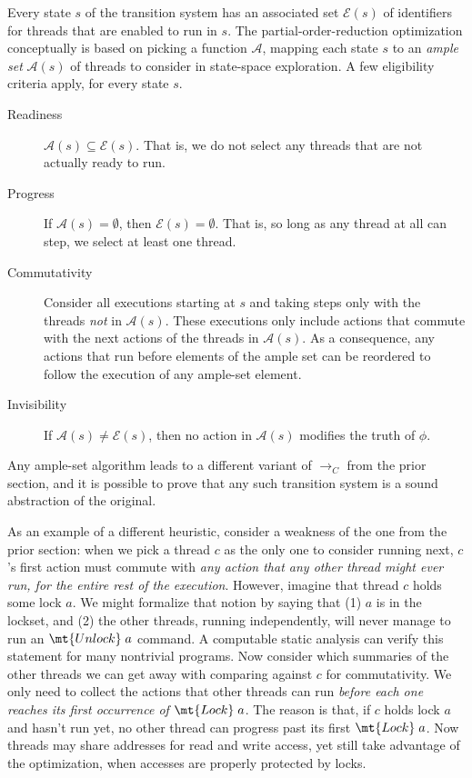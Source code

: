 \documentclass{amsbook}
\theoremstyle{definition}
\theoremstyle{remark}
\numberwithin{section}{chapter}
\numberwithin{equation}{chapter}
\begin{document}
Every state $s$ of the transition system has an associated set $\mathcal E(s)$ of identifiers for threads that are enabled to run in $s$.
The partial-order-reduction optimization conceptually is based on picking a function $\mathcal A$, mapping each state $s$ to an \emph{ample set} $\mathcal A(s)$ of threads to consider in state-space exploration.
A few eligibility criteria apply, for every state $s$.

\begin{description}
  \item[Readiness] $\mathcal A(s) \subseteq \mathcal E(s)$.  That is, we do not select any threads that are not actually ready to run.
  \item[Progress] If $\mathcal A(s) = \emptyset$, then $\mathcal E(s) = \emptyset$.  That is, so long as any thread at all can step, we select at least one thread.
  \item[Commutativity] Consider all executions starting at $s$ and taking steps only with the threads \emph{not} in $\mathcal A(s)$.  These executions only include actions that commute with the next actions of the threads in $\mathcal A(s)$.  As a consequence, any actions that run before elements of the ample set can be reordered to follow the execution of any ample-set element.
  \item[Invisibility] If $\mathcal A(s) \neq \mathcal E(s)$, then no action in $\mathcal A(s)$ modifies the truth of $\phi$.
\end{description}

Any ample-set algorithm leads to a different variant of $\to_C$ from the prior section, and it is possible to prove that any such transition system is a sound abstraction of the original.

As an example of a different heuristic, consider a weakness of the one from the prior section: when we pick a thread $c$ as the only one to consider running next, $c$'s first action must commute with \emph{any action that any other thread might ever run, for the entire rest of the execution}.
However, imagine that thread $c$ holds some lock $a$.
We might formalize that notion by saying that (1) $a$ is in the lockset, and (2) the other threads, running independently, will never manage to run an $\mt{Unlock} \; a$ command.
A computable static analysis can verify this statement for many nontrivial programs.
Now consider which summaries of the other threads we can get away with comparing against $c$ for commutativity.
We only need to collect the actions that other threads can run \emph{before each one reaches its first occurrence of $\mt{Lock} \; a$}.
The reason is that, if $c$ holds lock $a$ and hasn't run yet, no other thread can progress past its first $\mt{Lock} \; a$.
Now threads may share addresses for read and write access, yet still take advantage of the optimization, when accesses are properly protected by locks.
\end{document}
